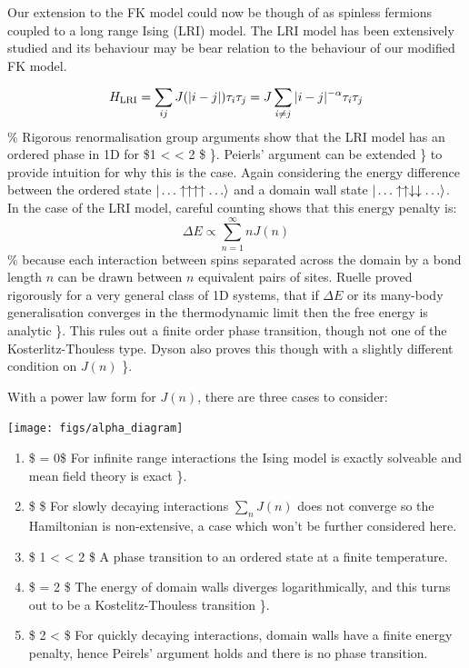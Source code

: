 Our extension to the FK model could now be though of as spinless
fermions coupled to a long range Ising (LRI) model. The LRI model has
been extensively studied and its behaviour may be bear relation to the
behaviour of our modified FK model.

\[H_{\mathrm{LRI}} = \sum_{ij} J(\abs{i-j}) \tau_i \tau_j = J \sum_{i\neq j} |i - j|^{-\alpha} \tau_i \tau_j\]
\% Rigorous renormalisation group arguments show that the LRI model has
an ordered phase in 1D for \$1 \textless{} \alpha \textless{} 2 \$
\textcite{dyson_existence_1969}\}. Peierls' argument can be extended
\textcite{thouless_long-range_1969}\} to provide intuition for why this
is the case. Again considering the energy difference between the ordered
state \(|\ldots\uparrow\uparrow\uparrow\uparrow\ldots\rangle\) and a
domain wall state
\(|\ldots\uparrow\uparrow\downarrow\downarrow\ldots\rangle\). In the case
of the LRI model, careful counting shows that this energy penalty is:
\[\Delta E \propto \sum_{n=1}^{\infty} n J(n)\] \% because each
interaction between spins separated across the domain by a bond length
\(n\) can be drawn between \(n\) equivalent pairs of sites. Ruelle
proved rigorously for a very general class of 1D systems, that if
\(\Delta E\) or its many-body generalisation converges in the
thermodynamic limit then the free energy is analytic
\textcite{ruelle_statistical_1968}\}. This rules out a finite order
phase transition, though not one of the Kosterlitz-Thouless type. Dyson
also proves this though with a slightly different condition on \(J(n)\)
\textcite{dyson_existence_1969}\}.

With a power law form for \(J(n)\), there are three cases to consider:

\begin{center}
    \texttt{[image: figs/alpha\_diagram]}
\end{center}

\begin{enumerate}
\def\labelenumi{\arabic{enumi}.}
\tightlist
\item
  \$ \alpha = 0\$ For infinite range interactions the Ising model is
  exactly solveable and mean field theory is exact
  \textcite{lipkin_validity_1965}\}.
\item
  \$ \alpha {}\$ For slowly decaying interactions \(\sum_n J(n)\)
  does not converge so the Hamiltonian is non-extensive, a case which
  won't be further considered here.
\item
  \$ 1 \textless{} \alpha \textless{} 2 \$ A phase transition to an
  ordered state at a finite temperature.
\item
  \$ \alpha = 2 \$ The energy of domain walls diverges logarithmically,
  and this turns out to be a Kostelitz-Thouless transition
  \textcite{thouless_long-range_1969}\}.
\item
  \$ 2 \textless{} \alpha \$ For quickly decaying interactions, domain
  walls have a finite energy penalty, hence Peirels' argument holds and
  there is no phase transition.
\end{enumerate}

